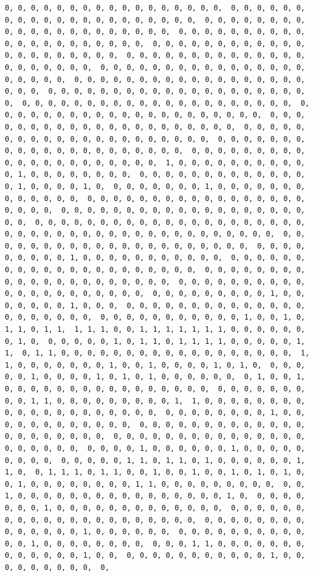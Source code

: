 \documentclass[
]{article}
\begin{document}
\begin{verbatim}
0, 0, 0, 0, 0, 0, 0, 0, 0, 0, 0, 0, 0, 0, 0, 0, 0,  0, 0, 0, 0, 0, 0, 0, 0, 0, 0, 0, 0, 0, 0, 0, 0, 0, 0, 0, 0, 0,  0, 0, 0, 0, 0, 0, 0, 0, 0, 0, 0, 0, 0, 0, 0, 0, 0, 0, 0, 0, 0,  0, 0, 0, 0, 0, 0, 0, 0, 0, 0, 0, 0, 0, 0, 0, 0, 0, 0, 0, 0, 0,  0, 0, 0, 0, 0, 0, 0, 0, 0, 0, 0, 0, 0, 0, 0, 0, 0, 0, 0, 0, 0,  0, 0, 0, 0, 0, 0, 0, 0, 0, 0, 0, 0, 0, 0, 0, 0, 0, 0, 0, 0, 0,  0, 0, 0, 0, 0, 0, 0, 0, 0, 0, 0, 0, 0, 0, 0, 0, 0, 0, 0, 0, 0,  0, 0, 0, 0, 0, 0, 0, 0, 0, 0, 0, 0, 0, 0, 0, 0, 0, 0, 0, 0, 0,  0, 0, 0, 0, 0, 0, 0, 0, 0, 0, 0, 0, 0, 0, 0, 0, 0, 0, 0, 0, 0,  0, 0, 0, 0, 0, 0, 0, 0, 0, 0, 0, 0, 0, 0, 0, 0, 0, 0, 0, 0, 0,  0, 0, 0, 0, 0, 0, 0, 0, 0, 0, 0, 0, 0, 0, 0, 0, 0, 0, 0, 0, 0,  0, 0, 0, 0, 0, 0, 0, 0, 0, 0, 0, 0, 0, 0, 0, 0, 0, 0, 0, 0, 0,  0, 0, 0, 0, 0, 0, 0, 0, 0, 0, 0, 0, 0, 0, 0, 0, 0, 0, 0, 0, 0,  0, 0, 0, 0, 0, 0, 0, 0, 0, 0, 0, 0, 0, 0, 0, 0, 0, 0, 0, 0, 0,  0, 0, 0, 0, 0, 0, 0, 0, 0, 0, 0, 0, 0, 0, 0, 0, 0, 0, 0, 0, 0,  1, 0, 0, 0, 0, 0, 0, 0, 0, 0, 0, 0, 1, 0, 0, 0, 0, 0, 0, 0, 0,  0, 0, 0, 0, 0, 0, 0, 0, 0, 0, 0, 0, 0, 0, 1, 0, 0, 0, 0, 1, 0,  0, 0, 0, 0, 0, 0, 0, 1, 0, 0, 0, 0, 0, 0, 0, 0, 0, 0, 0, 0, 0,  0, 0, 0, 0, 0, 0, 0, 0, 0, 0, 0, 0, 0, 0, 0, 0, 0, 0, 0, 0, 0,  0, 0, 0, 0, 0, 0, 0, 0, 0, 0, 0, 0, 0, 0, 0, 0, 0, 0, 0, 0, 0,  0, 0, 0, 0, 0, 0, 0, 0, 0, 0, 0, 0, 0, 0, 0, 0, 0, 0, 0, 0, 0,  0, 0, 0, 0, 0, 0, 0, 0, 0, 0, 0, 0, 0, 0, 0, 0, 0, 0, 0, 0, 0,  0, 0, 0, 0, 0, 0, 0, 0, 0, 0, 0, 0, 0, 0, 0, 0, 0, 0, 0, 0, 0,  0, 0, 0, 0, 0, 0, 0, 0, 0, 1, 0, 0, 0, 0, 0, 0, 0, 0, 0, 0, 0,  0, 0, 0, 0, 0, 0, 0, 0, 0, 0, 0, 0, 0, 0, 0, 0, 0, 0, 0, 0, 0,  0, 0, 0, 0, 0, 0, 0, 0, 0, 0, 0, 0, 0, 0, 0, 0, 0, 0, 0, 0, 0,  0, 0, 0, 0, 0, 0, 0, 0, 0, 0, 0, 0, 0, 0, 0, 0, 0, 0, 0, 0, 0,  0, 0, 0, 0, 0, 0, 0, 0, 0, 1, 0, 0, 0, 0, 0, 0, 0, 1, 0, 0, 0,  0, 0, 0, 0, 0, 0, 0, 0, 0, 0, 0, 0, 0, 0, 0, 0, 0, 0, 0, 0, 0,  0, 0, 0, 0, 0, 0, 0, 0, 0, 0, 0, 1, 0, 0, 1, 0, 1, 1, 0, 1, 1,  1, 1, 1, 0, 0, 1, 1, 1, 1, 1, 1, 1, 0, 0, 0, 0, 0, 0, 0, 1, 0,  0, 0, 0, 0, 0, 1, 0, 1, 1, 0, 1, 1, 1, 1, 0, 0, 0, 0, 0, 1, 1,  0, 1, 1, 0, 0, 0, 0, 0, 0, 0, 0, 0, 0, 0, 0, 0, 0, 0, 0, 0, 0,  1, 1, 0, 0, 0, 0, 0, 0, 0, 1, 0, 0, 1, 0, 0, 0, 0, 1, 0, 1, 0,  0, 0, 0, 0, 0, 1, 0, 0, 0, 0, 1, 0, 1, 0, 1, 0, 0, 0, 0, 0, 0,  0, 1, 0, 0, 1, 0, 0, 0, 0, 0, 0, 0, 0, 0, 0, 0, 0, 0, 0, 0, 0,  0, 0, 0, 0, 0, 0, 0, 0, 0, 1, 1, 0, 0, 0, 0, 0, 0, 0, 0, 0, 1,  1, 0, 0, 0, 0, 0, 0, 0, 0, 0, 0, 0, 0, 0, 0, 0, 0, 0, 0, 0, 0,  0, 0, 0, 0, 0, 0, 0, 0, 1, 0, 0, 0, 0, 0, 0, 0, 0, 0, 0, 0, 0,  0, 0, 0, 0, 0, 0, 0, 0, 0, 0, 0, 0, 0, 0, 0, 0, 0, 0, 0, 0, 0,  0, 0, 0, 0, 0, 0, 0, 0, 0, 0, 0, 0, 0, 0, 0, 0, 0, 0, 0, 0, 0,  0, 0, 0, 0, 1, 0, 0, 0, 0, 0, 0, 1, 0, 0, 0, 0, 0, 0, 0, 0, 0,  0, 0, 0, 0, 0, 1, 1, 0, 1, 1, 0, 1, 0, 0, 0, 0, 0, 0, 1, 1, 0,  0, 1, 1, 1, 0, 1, 1, 0, 0, 1, 0, 0, 1, 0, 0, 1, 0, 1, 0, 1, 0,  0, 1, 0, 0, 0, 0, 0, 0, 0, 0, 1, 1, 0, 0, 0, 0, 0, 0, 0, 0, 0,  0, 0, 1, 0, 0, 0, 0, 0, 0, 0, 0, 0, 0, 0, 0, 0, 0, 0, 0, 1, 0,  0, 0, 0, 0, 0, 0, 0, 1, 0, 0, 0, 0, 0, 0, 0, 0, 0, 0, 0, 0, 0,  0, 0, 0, 0, 0, 0, 0, 0, 0, 0, 0, 0, 0, 0, 0, 0, 0, 0, 0, 0, 0,  0, 0, 0, 0, 0, 0, 0, 0, 0, 0, 0, 0, 0, 0, 1, 0, 0, 0, 0, 0, 0,  0, 0, 0, 0, 0, 0, 0, 0, 0, 0, 0, 0, 1, 0, 0, 0, 0, 0, 0, 0, 0,  0, 0, 0, 1, 1, 0, 0, 0, 0, 0, 0, 0, 0, 0, 0, 0, 0, 0, 1, 0, 0,  0, 0, 0, 0, 0, 0, 0, 0, 0, 0, 0, 1, 0, 0, 0, 0, 0, 0, 0, 0, 0,  0, 
\end{verbatim}
\end{document}
